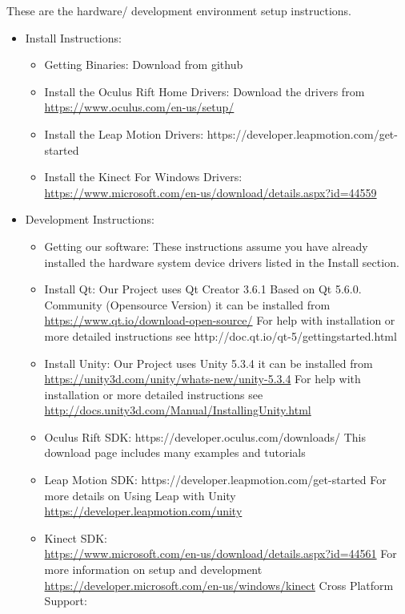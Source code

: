 \documentclass[a4paper,10pt]{article}
\begin{document}
These are the hardware/ development environment setup instructions. 
\begin{itemize}
 \item Install Instructions:
 \begin{itemize}
 \item  Getting Binaries: Download from github
  \item Install the Oculus Rift Home Drivers: Download the drivers from~\\ \url{https://www.oculus.com/en-us/setup/}
  \item Install the Leap Motion Drivers: https://developer.leapmotion.com/get-started
  \item Install the Kinect For Windows Drivers: ~\\\url{https://www.microsoft.com/en-us/download/details.aspx?id=44559}
 \end{itemize}
 \item Development Instructions:
  \begin{itemize}
   \item Getting our software: These instructions assume you have already installed the hardware system device drivers 
listed in the Install section.
\item Install Qt:
Our Project uses Qt Creator 3.6.1 Based on Qt 5.6.0. Community (Opensource Version) 
it can be installed from ~\\\url{https://www.qt.io/download-open-source/}
For help with installation or more detailed instructions see
http://doc.qt.io/qt-5/gettingstarted.html 
\item Install Unity:
Our Project uses Unity 5.3.4 
it can be installed from 
~\\\url{https://unity3d.com/unity/whats-new/unity-5.3.4}
For help with installation or more detailed instructions see
~\\\url{http://docs.unity3d.com/Manual/InstallingUnity.html}
\item Oculus Rift SDK:
https://developer.oculus.com/downloads/
This download page includes many examples and tutorials
\item Leap Motion SDK:
https://developer.leapmotion.com/get-started
For more details on Using Leap with Unity ~\\\url{https://developer.leapmotion.com/unity} 
\item Kinect SDK:
~\\\url{https://www.microsoft.com/en-us/download/details.aspx?id=44561}
For more information on setup and development  ~\\\url{https://developer.microsoft.com/en-us/windows/kinect}
Cross Platform Support:


\end{itemize}
\end{itemize}
\end{document}
